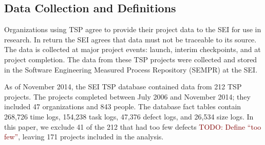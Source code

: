 \documentclass[smallcondensed]{svjour3}
\newcommand{\todo}[1]{\textcolor{Maroon}{TODO: #1}}
\newcommand{\bi}{\begin{itemize}}%
\newcommand{\ei}{\end{itemize}}
\begin{document}
\subsection{Data Collection and Definitions}
\label{sec:data-collection}

Organizations using TSP agree to provide their project data to the SEI for use in research. In return the SEI agrees that  data must not be traceable to its source. The data is collected at major project events: launch, interim checkpoints, and at project completion. The data from these TSP projects were collected and stored in the Software Engineering Measured Process Repository (SEMPR) at the SEI. 

As of November 2014, the SEI TSP database contained data from 212
TSP projects. The projects completed between July 2006 and
November 2014; they included 47 organizations and 843 people. 
The database fact tables
contain 268,726 time logs, 
154,238 task logs,
 47,376 defect logs, 
and 26,534 size logs. 
In this paper, we exclude 41 of the 212 that had too few defects \todo{Define ``too few''}, leaving 171 projects included in the analysis.

 

\end{document}
